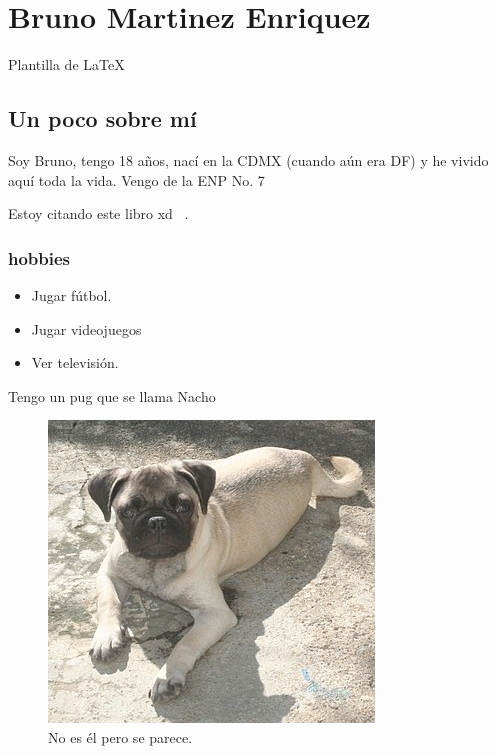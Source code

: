 
\chapter{Bruno Martinez Enriquez}

Plantilla de \large{\LaTeX}
\section{Un poco sobre mí}

Soy Bruno, tengo 18 años, nací en la CDMX (cuando aún era DF) y he vivido aquí toda la vida.
Vengo de la ENP No. 7

Estoy citando este libro xd ~\cite{Floodlight}.

\subsection{hobbies}
\begin{itemize}
\item Jugar fútbol.
\item Jugar videojuegos
\item Ver televisión.
\end {itemize}

Tengo un pug que se llama Nacho
\begin{figure}[h]
  \centering
  \includegraphics[scale=0.5]{IMG/30.jpg}
  \caption{No es él pero se parece.}
  \label{fig:pug}
\end{figure}
